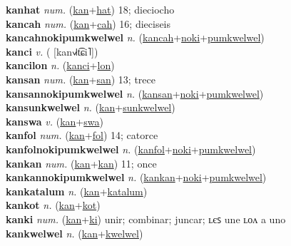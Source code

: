 \textbf{kanhat} \textit{num.} (\hyperref[kan]{kan}+\hyperref[hat]{hat})
18; dieciocho \label{kanhat} \\
\textbf{kancah} \textit{num.} (\hyperref[kan]{kan}+\hyperref[cah]{cah})
16; dieciseis \label{kancah} \\
\textbf{kancahnokipumkwelwel} \textit{n.} (\hyperref[kancah]{kancah}+\hyperref[noki]{noki}+\hyperref[pumkwelwel]{pumkwelwel})
 \label{kancahnokipumkwelwel} \\
\textbf{kanci} \textit{v.} ( [kan˧˩˧t͡ɕi˥])
 \label{kanci} \\
\textbf{kancilon} \textit{n.} (\hyperref[kanci]{kanci}+\hyperref[lon]{lon})
 \label{kancilon} \\
\textbf{kansan} \textit{num.} (\hyperref[kan]{kan}+\hyperref[san]{san})
13; trece \label{kansan} \\
\textbf{kansannokipumkwelwel} \textit{n.} (\hyperref[kansan]{kansan}+\hyperref[noki]{noki}+\hyperref[pumkwelwel]{pumkwelwel})
 \label{kansannokipumkwelwel} \\
\textbf{kansunkwelwel} \textit{n.} (\hyperref[kan]{kan}+\hyperref[sunkwelwel]{sunkwelwel})
 \label{kansunkwelwel} \\
\textbf{kanswa} \textit{v.} (\hyperref[kan]{kan}+\hyperref[swa]{swa})
 \label{kanswa} \\
\textbf{kanfol} \textit{num.} (\hyperref[kan]{kan}+\hyperref[fol]{fol})
14; catorce \label{kanfol} \\
\textbf{kanfolnokipumkwelwel} \textit{n.} (\hyperref[kanfol]{kanfol}+\hyperref[noki]{noki}+\hyperref[pumkwelwel]{pumkwelwel})
 \label{kanfolnokipumkwelwel} \\
\textbf{kankan} \textit{num.} (\hyperref[kan]{kan}+\hyperref[kan]{kan})
11; once \label{kankan} \\
\textbf{kankannokipumkwelwel} \textit{n.} (\hyperref[kankan]{kankan}+\hyperref[noki]{noki}+\hyperref[pumkwelwel]{pumkwelwel})
 \label{kankannokipumkwelwel} \\
\textbf{kankatalum} \textit{n.} (\hyperref[kan]{kan}+\hyperref[katalum]{katalum})
 \label{kankatalum} \\
\textbf{kankot} \textit{n.} (\hyperref[kan]{kan}+\hyperref[kot]{kot})
 \label{kankot} \\
\textbf{kanki} \textit{num.} (\hyperref[kan]{kan}+\hyperref[ki]{ki})
unir; combinar; juncar; ʟєꜱ une ʟᴏᴧ a uno \label{kanki} \\
\textbf{kankwelwel} \textit{n.} (\hyperref[kan]{kan}+\hyperref[kwelwel]{kwelwel})
 \label{kankwelwel} \\
